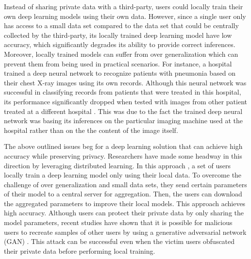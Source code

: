\documentclass[conference]{IEEEtran}
\begin{document}
Instead of sharing private data with a third-party, users could locally train their own deep learning models using their own
data. However, since a single user only has access to a small data set compared to the data set that could be centrally
collected by the third-party, its locally trained deep learning model have low accuracy, which
significantly degrades its ability to provide correct inferences. 
Moreover, locally trained models can suffer from over generalization which can prevent them from being used in practical scenarios.
For instance, a hospital trained a deep neural network to recognize patients with pneumonia based on their
chest X-ray images using its own records. Although this neural network was successful in classifying records from patients that were
treated in this hospital, its performance significantly dropped when tested with images from other patient treated at a different
hospital \cite{zech2018variable}. This was due to the fact the trained deep neural network was basing its inferences on the
particular imaging machine used at the hospital  rather than on the the content of the image itself.
 
The above outlined issues beg for a deep learning solution that can achieve high accuracy while preserving privacy. 
Researchers have made some headway in this direction by leveraging distributed learning.
In this approach  \cite{shokri2015privacy},  a set of users locally
train a deep learning model only using their local data. To overcome the challenge of over generalization and small
data sets, they send certain parameters of their model to a central server for aggregation. 
Then, the users can download the aggregated parameters to improve their local models. This approach achieves high accuracy.
Although users can protect their private data by only sharing the model parameters, recent studies have
shown that it is possible for malicious users to recreate samples of other users by using a generative
adversarial network (GAN) \cite{hitaj2017deep}. This attack can be successful even when the victim users 
obfuscated their private data before performing  local training. 
\end{document}
